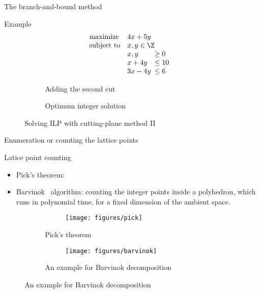 \begin{frame}{The branch-and-bound method}
	\begin{block}{Example}
\begin{equation*}
	\begin{array}{ll@{}ll}
		\text{maximize}  & \displaystyle  4x + 5y & &\\
		\text{subject to}&  x,y \in \Z &&\\
		&x, y&\ge 0&\\
		&x + 4y &\le 10 &\\
		& 3x - 4y &\le 6&		
	\end{array}
\end{equation*}
\begin{figure}[H]
	\centering %
	\begin{subfigure}{0.5\textwidth}
		\resizebox{\linewidth}{!}{}
		\caption{Adding the second cut}
		\label{fig:bb1}
	\end{subfigure}\hfil %
	\begin{subfigure}{0.5\textwidth}
		\resizebox{\linewidth}{!}{}
		\caption{Optimum integer solution}
		\label{fig:bb2}
	\end{subfigure}
	\caption{Solving ILP with cutting-plane method II}
	\label{fig:bb}
\end{figure}
	\end{block}
\end{frame}


\begin{frame}{Enumeration or counting the lattice points}
	\begin{block}{Latice point counting}
		\begin{itemize}
			\item Pick's theorem:

		\item Barvinok~\cite{DBLP:journals/mor/Barvinok94} algorithm: 	counting the integer points inside a polyhedron, which runs in
		polynomial time, for a fixed dimension of the ambient space.
		
		\end{itemize}
	\begin{figure}[H]
		\centering %
		\begin{subfigure}{0.25\textwidth}
						\begin{figure}[H]
				\texttt{[image: figures/pick]}
			\end{figure}
			\caption{Pick's theorem}
		\end{subfigure}\hfil %
		\begin{subfigure}{0.75\textwidth}
				\begin{figure}[H]
				\texttt{[image: figures/barvinok]}
			\end{figure}
			\caption{An example for Barvinok decomposition}
		\end{subfigure}
	\end{figure}
	\end{block}
\end{frame}


